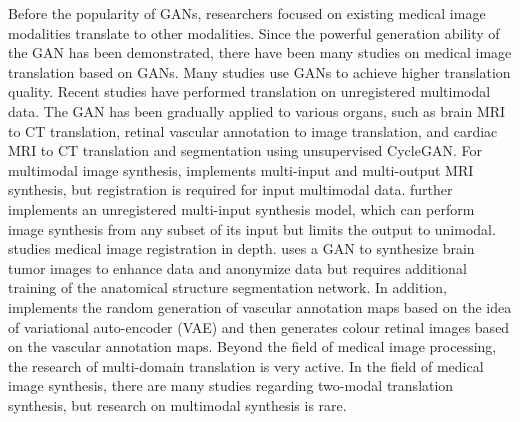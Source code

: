 \documentclass{ecai}
\begin{document}
Before the popularity of GANs, researchers focused on existing medical image modalities translate to other modalities\cite{22burgos2015robust,33huang2017simultaneous,34vemulapalli2015unsupervised,36vannguyen2015crossdomain}. Since the powerful generation ability of the GAN has been demonstrated, there have been many studies on medical image translation based on GANs\cite{2zhang2018translating,20nie2017medical,35osokin2017gans,36vannguyen2015crossdomain,40kamnitsas2017unsupervised}. Many studies use GANs to achieve higher translation quality\cite{1zhao2018modular,5liang2018generative,6zhu2017unpaired,13choi2018stargan:}. Recent studies have performed translation on unregistered multimodal data\cite{2zhang2018translating,85joyce2017robust}.
The GAN has been gradually applied to various organs, such as brain MRI to CT translation\cite{20nie2017medical,40kamnitsas2017unsupervised}, retinal vascular annotation to image translation\cite{41costa2017towards}, and cardiac MRI to CT translation and segmentation using unsupervised CycleGAN\cite{6zhu2017unpaired,20nie2017medical}.
For multimodal image synthesis, \cite{84chartsias2018multimodal} implements multi-input and multi-output MRI synthesis, but registration is required for input multimodal data. \cite{85joyce2017robust} further implements an unregistered multi-input synthesis model, which can perform image synthesis from any subset of its input but limits the output to unimodal. \cite{66Miao2018dilated} studies medical image registration in depth. \cite{4shin2018medical} uses a GAN to synthesize brain tumor images to enhance data and anonymize data but requires additional training of the anatomical structure segmentation network.
In addition, \cite{41costa2017towards} implements the random generation of vascular annotation maps based on the idea of variational auto-encoder (VAE)\cite{87kingma2014auto-encoding} and then generates colour retinal images based on the vascular annotation maps.
Beyond the field of medical image processing, the research of multi-domain translation is very active\cite{1zhao2018modular,5liang2018generative,13choi2018stargan:,27isola2017image-to-image}.
In the field of medical image synthesis, there are many studies regarding two-modal translation synthesis\cite{2zhang2018translating,20nie2017medical,22burgos2015robust,34vemulapalli2015unsupervised,35osokin2017gans,36vannguyen2015crossdomain,40kamnitsas2017unsupervised}, but research on multimodal synthesis is rare\cite{84chartsias2018multimodal,85joyce2017robust,4shin2018medical}.
\end{document}
